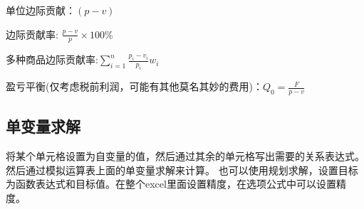 \documentclass[10pt, a4paper]{article}
\begin{document}
    单位边际贡献：$(p - v)$

    边际贡献率: $\frac{p - v}{p} \times 100\%$
    
    多种商品边际贡献率:$\sum_{i = 1}^{n}\frac{p_i - v_i}{p_i}w_i$
    
    盈亏平衡(仅考虑税前利润，可能有其他莫名其妙的费用)：$Q_0 = \frac{F}{p - v}$

    \subsection{单变量求解}
        将某个单元格设置为自变量的值，然后通过其余的单元格写出需要的关系表达式。然后通过模拟运算表上面的单变量求解来计算。 也可以使用规划求解，设置目标为函数表达式和目标值。在整个excel里面设置精度，在选项公式中可以设置精度。
\end{document}
